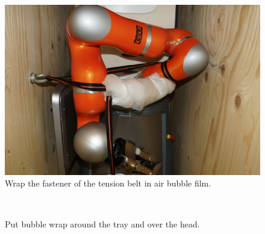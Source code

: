 \begin{figure}[h!]
\centering
\includegraphics[width=1\textwidth]{images/packing_21.jpg}\caption{Wrap the fastener of the tension belt in air bubble film.}
\end{figure}

\begin{figure}[h!]
\centering
\mbox{\quad
{}}
\caption{Put bubble wrap around the tray and over the head.} %
\end{figure}

